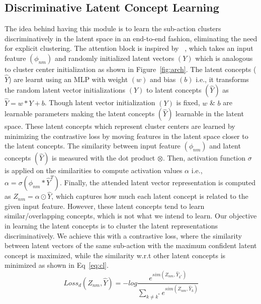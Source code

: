 \documentclass[final]{cvpr}
\begin{document}
\subsection{Discriminative Latent Concept Learning}
\label{sec:dislc}
\par The idea behind having this module is to learn the sub-action clusters discriminatively in the latent space in an end-to-end fashion, eliminating the need for explicit clustering. 
The attention block is inspired by ~\cite{hussein2019videograph}, which  takes an input feature $(\phi_{nm})$ and randomly initialized latent vectors $(Y)$ which is analogous to cluster center initialization as shown in Figure~\ref{fig:arch}. The latent concepts ($\widehat{Y}$) are learnt using an MLP with weight $(w)$ and bias $(b)$ i.e., it transforms the random latent vector initializations $(Y)$ to latent concepts $(\widehat{Y})$  as $\widehat{Y} = w * Y + b$. Though latent vector initialization $(Y)$ is fixed, $w$ \& $b$ are learnable parameters making the latent concepts $(\widehat{Y})$ learnable in the latent space.  These latent concepts which represent cluster centers are learned by minimizing the contrastive loss by moving features in the latent space closer to the latent concepts. The similarity  between input feature $(\phi_{nm})$ and latent concepts $(\widehat{Y})$ is measured with the dot product $\otimes$.  Then, activation function $\sigma$ is applied on the similarities to compute activation values $\alpha$ i.e., $ \alpha = \sigma(\phi_{nm} * \widehat{Y}^{T})$. Finally, the attended latent vector representation is computed as $Z_{nm} = \alpha \odot \widehat{Y}$, which captures how much each latent concept is related to the given input feature. 
However, these latent concepts tend to learn similar/overlapping concepts, which is not what we intend to learn.
Our objective in learning the latent concepts is to cluster the latent representations discriminatively. We achieve this with a contrastive loss, where the similarity between latent vectors of the same sub-action with the maximum confident latent concept is maximized, while the similarity w.r.t other latent concepts is minimized as shown in Eq~\ref{eq:cl}.
\vspace{-0.4cm}
\begin{equation}
Loss_{d}(Z_{nm}, \widehat{Y}) = -log \frac{e^{sim(Z_{nm}, \widehat{Y}_{k^{*}})}}{\sum_{k \neq k^{*}} e^{sim(Z_{nm}, \widehat{Y}_{k})}} \label{eq:cl} \end{equation}
\vspace{-0.3cm}
\end{document}
